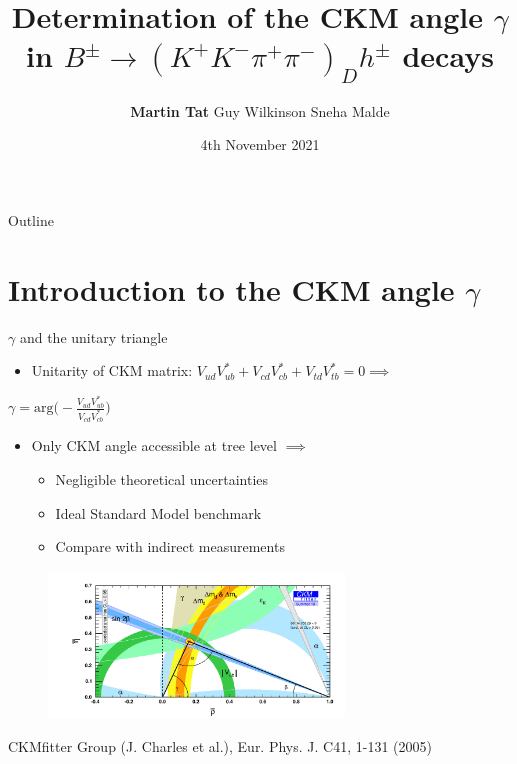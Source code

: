 \documentclass{beamer}
\title[$B^\pm\to(K^+K^-\pi^+\pi^-)_Dh^\pm$]{Determination of the CKM angle \texorpdfstring{$\gamma$}{gamma} in \texorpdfstring{$B^\pm\to(K^+K^-\pi^+\pi^-)_Dh^\pm$}{B to K+K-pi+pi-} decays}
\author{\textbf{Martin Tat} \hspace{0.54em} Guy Wilkinson \hspace{0.54em} Sneha Malde}
\institute{\normalsize University of Oxford \\ \vspace{0.3cm} \normalsize B2OC Meeting \vspace{-0.2cm}}
\date{4th November 2021}
\begin{document}
\begin{frame}
  \titlepage
\end{frame}

\begin{frame}{Outline}
  \tableofcontents
\end{frame}

\section{Introduction to the CKM angle \texorpdfstring{$\gamma$}{gamma}}
\begin{frame}{$\gamma$ and the unitary triangle}
  \begin{itemize}
    \setlength\itemsep{1.0em}
    \item{Unitarity of CKM matrix: $V_{ud}V^*_{ub} + V_{cd}V^*_{cb} + V_{td}V^*_{tb} = 0\implies$}
    \end{itemize}
    \begin{center}
    $\gamma = \text{arg}\Big(-\frac{V_{ud}V^*_{ub}}{V_{cd}V^*_{cb}}\Big)$
  \end{center}
  \begin{itemize}
    \item{Only CKM angle accessible at tree level $\implies$}
    \begin{itemize}
      \item{Negligible theoretical uncertainties}
      \item{Ideal Standard Model benchmark}
      \item{Compare with indirect measurements}
    \end{itemize}
  \end{itemize}
  \vspace{-0.2cm}
  \begin{figure}
    \includegraphics[width = 0.70\textwidth]{Plots/ckmfitter2.pdf}
  \end{figure}
  \vspace{-0.5cm}
  \begin{center}
    \tiny{CKMfitter Group (J. Charles et al.), Eur. Phys. J. C41, 1-131 (2005)}
  \end{center}
\end{frame}
\end{document}
